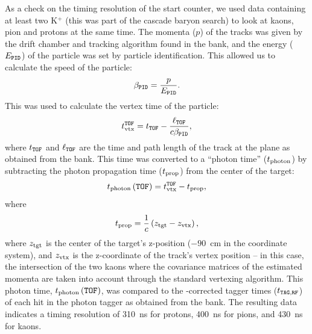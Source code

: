 \FloatBarrier

As a check on the timing resolution of the start counter, we used data containing at least two K$^+$ (this was part of the cascade baryon search) to look at kaons, pion and protons at the same time. The momenta ($p$) of the tracks was given by the drift chamber and tracking algorithm found in the  bank, and the energy ($E_{\mathtt{PID}}$) of the particle was set by particle identification. This allowed us to calculate the speed of the particle:
\begin{equation}
    \beta_{\mathtt{PID}} = \frac{p}{E_{\mathtt{PID}}}.
    \label{eqn:betapid}
\end{equation}
This was used to calculate the vertex time of the particle:
\begin{equation}
    t_{\mathrm{vtx}}^{\mathtt{TOF}} = t_{\mathtt{TOF}} - \frac{\ell_{\mathtt{TOF}}}{c\beta_{\mathtt{PID}}},
    \label{eqn:tvtofpid}
\end{equation}
where $t_{\mathtt{TOF}}$ and $\ell_{\mathtt{TOF}}$ are the time and path length of the track at the  plane as obtained from the  bank. This time was converted to a ``photon time'' ($t_\mathrm{photon}$) by subtracting the photon propagation time ($t_{\mathrm{prop}}$) from the center of the target:
\begin{equation}
    t_\mathrm{photon}\left(\mathtt{TOF}\right) = t_{\mathrm{vtx}}^{\mathtt{TOF}} - t_{\mathrm{prop}},
    \label{eqn:tphotofpid}
\end{equation}
where
\begin{equation}
    t_{\mathrm{prop}} = \frac{1}{c} \left( z_\mathrm{tgt} - z_\mathrm{vtx} \right),
\end{equation}
where $z_\mathrm{tgt}$ is the center of the target's z-position ($-90$~cm in the  coordinate system), and $z_\mathrm{vtx}$ is the z-coordinate of the track's vertex position -- in this case, the intersection of the two kaons where the covariance matrices of the estimated momenta are taken into account through the standard  vertexing algorithm. This photon time, $t_\mathrm{photon}\left(\mathtt{TOF}\right)$, was compared to the -corrected tagger times ($t_{\mathtt{TAG},\mathtt{RF}}$) of each hit in the photon tagger as obtained from the  bank. The resulting data indicates a timing resolution of 310~ns for protons, 400~ns for pions, and 430~ns for kaons.

